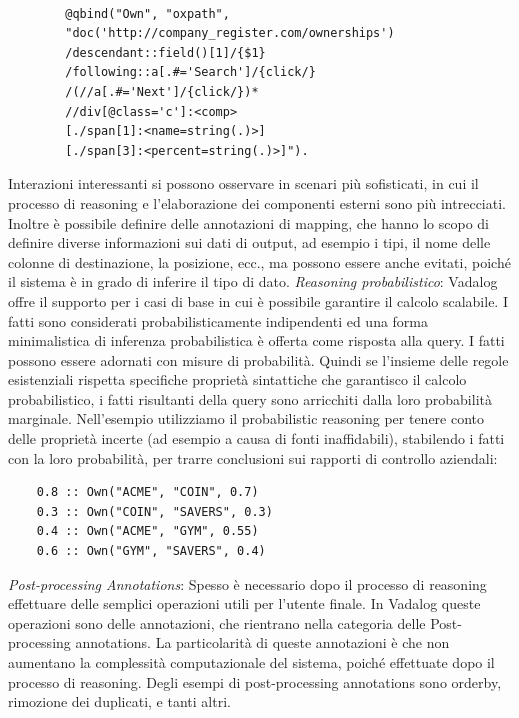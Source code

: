 \begin{example}\label{ex-3}
	\normalfont
	\begin{lstlisting}
	
		@qbind("Own", "oxpath", 
		"doc('http://company_register.com/ownerships') 
		/descendant::field()[1]/{$1} 
		/following::a[.#='Search']/{click/} 
		/(//a[.#='Next']/{click/})* 
		//div[@class='c']:<comp> 
		[./span[1]:<name=string(.)>] 
		[./span[3]:<percent=string(.)>]"). 
	\end{lstlisting}
\end{example}
Interazioni interessanti si possono osservare in scenari più sofisticati, in cui il processo di reasoning e l'elaborazione dei componenti esterni sono più intrecciati. \newline
Inoltre è possibile definire delle annotazioni di mapping, che hanno lo scopo di definire diverse informazioni sui dati di output, ad esempio i tipi, il nome delle colonne di destinazione, la posizione, ecc., ma possono essere anche evitati, poiché il sistema è in grado di inferire il tipo di dato. \newline \newline
\emph{Reasoning probabilistico}: Vadalog offre il supporto per i casi di base in cui è possibile garantire il calcolo scalabile. I fatti sono considerati probabilisticamente indipendenti ed una forma minimalistica di inferenza probabilistica è offerta come risposta alla query. I fatti possono essere adornati con misure di probabilità. \newline
Quindi se l'insieme delle regole esistenziali rispetta specifiche proprietà sintattiche che garantisco il calcolo probabilistico, i fatti risultanti della query sono arricchiti dalla loro probabilità marginale. \newline
Nell'esempio utilizziamo il probabilistic reasoning per tenere conto delle proprietà incerte (ad esempio a causa di fonti inaffidabili), stabilendo i fatti con la loro probabilità, per trarre conclusioni sui rapporti di controllo aziendali:
\begin{lstlisting}
	0.8 :: Own("ACME", "COIN", 0.7) 
	0.3 :: Own("COIN", "SAVERS", 0.3) 
	0.4 :: Own("ACME", "GYM", 0.55) 
	0.6 :: Own("GYM", "SAVERS", 0.4)
\end{lstlisting}
\emph{Post-processing Annotations}: Spesso è necessario dopo il processo di reasoning effettuare delle semplici operazioni utili per l'utente finale. \newline
In Vadalog queste operazioni sono delle annotazioni, che rientrano nella categoria delle Post-processing annotations. La particolarità di queste annotazioni è che non aumentano la complessità computazionale del sistema, poiché effettuate dopo il processo di reasoning. Degli esempi di post-processing annotations sono orderby, rimozione dei duplicati, e tanti altri. \newline \newline
